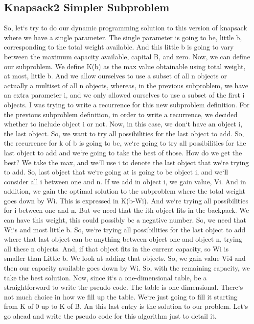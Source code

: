 \subsection{Knapsack2  Simpler Subproblem}
So, let`s try to do our dynamic programming solution to this version of knapsack where we have a single parameter.
The single parameter is going to be, little b, corresponding to the total weight available.
And this little b is going to vary between the maximum capacity available, capital B, and zero.
Now, we can define our subproblem.
We define K(b) as the max value obtainable using total weight, at most, little b.
And we allow ourselves to use a subset of all n objects or actually a multiset of all n objects, whereas, in the previous subproblem, we have an extra parameter i, and we only allowed ourselves to use a subset of the first i objects.
I was trying to write a recurrence for this new subproblem definition.
For the previous subproblem definition, in order to write a recurrence, we decided whether to include object i or not.
Now, in this case, we don`t have an object i, the last object.
So, we want to try all possibilities for the last object to add.
So, the recurrence for k of b is going to be, we`re going to try all possibilities for the last object to add and we`re going to take the best of those.
How do we get the best? We take the max, and we`ll use i to denote the last object that we`re trying to add.
So, last object that we`re going at is going to be object i, and we`ll consider all i between one and n.
If we add in object i, we gain value, Vi.
And in addition, we gain the optimal solution to the subproblem where the total weight goes down by Wi.
This is expressed in K(b-Wi).
And we`re trying all possibilities for i between one and n.
But we need that the ith object fits in the backpack.
We can have this weight, this could possibly be a negative number.
So, we need that Wi`s and most little b.
So, we`re trying all possibilities for the last object to add where that last object can be anything between object one and object n, trying all these n objects.
And, if that object fits in the current capacity, so Wi is smaller than Little b.
We look at adding that objects.
So, we gain value Vi4 and then our capacity available goes down by Wi.
So, with the remaining capacity, we take the best solution.
Now, since it`s a one-dimensional table, be a straightforward to write the pseudo code.
The table is one dimensional.
There`s not much choice in how we fill up the table.
We`re just going to fill it starting from K of 0 up to K of B\@.
An this last entry is the solution to our problem.
Let`s go ahead and write the pseudo code for this algorithm just to detail it.

